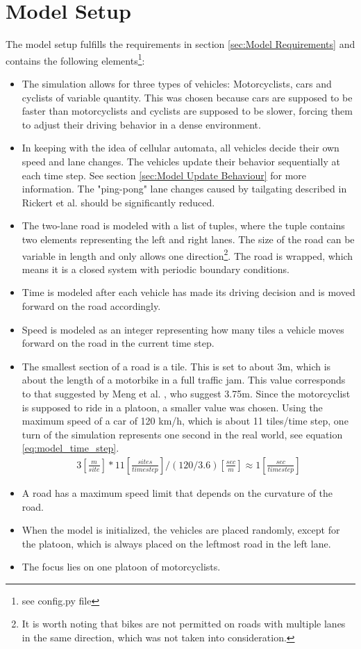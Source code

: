 \section{Model Setup}
\label{sec:Model Setup}
The model setup fulfills the requirements in section \ref{sec:Model Requirements} and contains the following elements\footnote{see config.py file}:
\begin{itemize}
\item The simulation allows for three types of vehicles: Motorcyclists, cars and cyclists of variable quantity. This was chosen because cars are supposed to be faster than motorcyclists and cyclists are supposed to be slower, forcing them to adjust their driving behavior in a dense environment.
\item In keeping with the idea of cellular automata, all vehicles decide their own speed and lane changes. The vehicles update their behavior sequentially at each time step. See section \ref{sec:Model Update Behaviour} for more information. The "ping-pong" lane changes caused by tailgating described in Rickert et al.\cite{RICKERT1996534} should be significantly reduced.
\item The two-lane road is modeled with a list of tuples, where the tuple contains two elements representing the left and right lanes. The size of the road can be variable in length and only allows one direction\footnote{It is worth noting that bikes are not permitted on roads with multiple lanes in the same direction, which was not taken into consideration.}. The road is wrapped, which means it is a closed system with periodic boundary conditions. 
\item Time is modeled after each vehicle has made its driving decision and is moved forward on the road accordingly.
\item Speed is modeled as an integer representing how many tiles a vehicle moves forward on the road in the current time step.
\item The smallest section of a road is a tile. This is set to about 3m, which is about the length of a motorbike in a full traffic jam. This value corresponds to that suggested by Meng et al. \cite{MENG2007470}, who suggest 3.75m. Since the motorcyclist is supposed to ride in a platoon, a smaller value was chosen. Using the maximum speed of a car of 120 km/h, which is about 11 tiles/time step, one turn of the simulation represents one second in the real world, see equation \ref{eq:model_time_step}.
    \begin{align}
        3[\frac{m}{site}] * 11[\frac{sites}{time step}] / (120/3.6)[\frac{sec}{m}]\approx 1[\frac{sec}{time step}]
        \label{eq:model_time_step}
    \end{align}
\item A road has a maximum speed limit that depends on the curvature of the road. 
\item When the model is initialized, the vehicles are placed randomly, except for the platoon, which is always placed on the leftmost road in the left lane.
\item The focus lies on one platoon of motorcyclists. 
\end{itemize}

